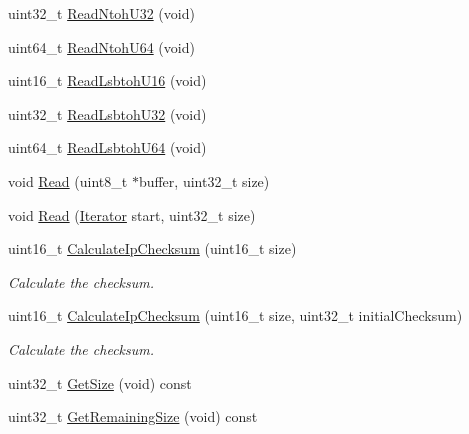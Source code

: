 \begin{DoxyCompactItemize}
uint32\+\_\+t \hyperlink{classns3_1_1Buffer_1_1Iterator_af6873e0c53e5338902802dedff2159d1}{Read\+Ntoh\+U32} (void)
\item 
uint64\+\_\+t \hyperlink{classns3_1_1Buffer_1_1Iterator_a388a240a39c74ea18028d3299625fdb3}{Read\+Ntoh\+U64} (void)
\item 
uint16\+\_\+t \hyperlink{classns3_1_1Buffer_1_1Iterator_a987b700afdfba28b1b7d7bd2e885775d}{Read\+Lsbtoh\+U16} (void)
\item 
uint32\+\_\+t \hyperlink{classns3_1_1Buffer_1_1Iterator_a393ecef0088e69e05b839dbdca2c6575}{Read\+Lsbtoh\+U32} (void)
\item 
uint64\+\_\+t \hyperlink{classns3_1_1Buffer_1_1Iterator_ab0da551e888b6ab0b285d28db0367d74}{Read\+Lsbtoh\+U64} (void)
\item 
void \hyperlink{classns3_1_1Buffer_1_1Iterator_a84e2f58f26fa3a3fec00c11e911b530a}{Read} (uint8\+\_\+t $\ast$buffer, uint32\+\_\+t size)
\item 
void \hyperlink{classns3_1_1Buffer_1_1Iterator_a0b48f5160b5df2f9d25e2922456ea44c}{Read} (\hyperlink{classns3_1_1Buffer_1_1Iterator}{Iterator} start, uint32\+\_\+t size)
\item 
uint16\+\_\+t \hyperlink{classns3_1_1Buffer_1_1Iterator_a3c7784ed3f45948da2cf8754ad1606d5}{Calculate\+Ip\+Checksum} (uint16\+\_\+t size)
\begin{DoxyCompactList}\small\item\em Calculate the checksum. \end{DoxyCompactList}\item 
uint16\+\_\+t \hyperlink{classns3_1_1Buffer_1_1Iterator_a4d8f395f3ca88de33ad8cea689c8b8ee}{Calculate\+Ip\+Checksum} (uint16\+\_\+t size, uint32\+\_\+t initial\+Checksum)
\begin{DoxyCompactList}\small\item\em Calculate the checksum. \end{DoxyCompactList}\item 
uint32\+\_\+t \hyperlink{classns3_1_1Buffer_1_1Iterator_ab3a410790754cf7c176fd53f3f4cad95}{Get\+Size} (void) const 
\item 
uint32\+\_\+t \hyperlink{classns3_1_1Buffer_1_1Iterator_a575b017060a063561e203d78089c6b8d}{Get\+Remaining\+Size} (void) const 
\end{DoxyCompactItemize}

